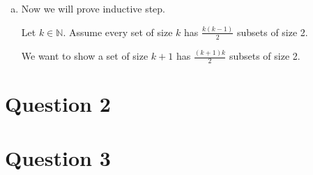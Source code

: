 \documentclass[12pt]{article}
\begin{document}
\begin{enumerate}[a.]
    \item

    Now we will prove inductive step.

    \bigskip

    Let $k \in \mathbb{N}$. Assume every set of size $k$ has $\frac{k(k-1)}{2}$
    subsets of size 2.

    \bigskip

    We want to show a set of size $k+1$ has $\frac{(k+1)k}{2}$ subsets of size 2.

\end{enumerate}

\section*{Question 2}

\section*{Question 3}
\end{document}
